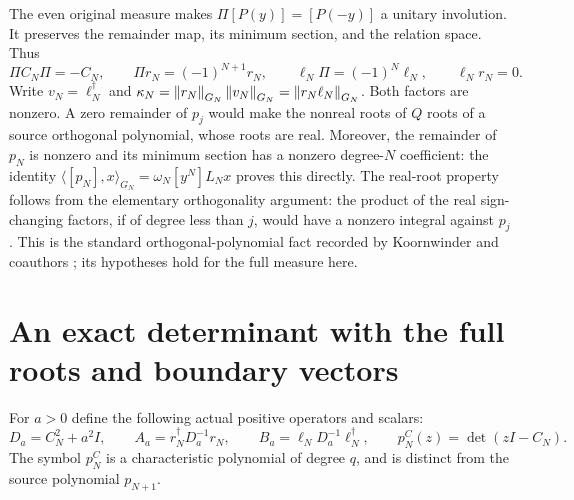 \documentclass[11pt]{article}
\begin{document}
The even original measure makes $\Pi[P(y)]=[P(-y)]$ a unitary involution.
It preserves the remainder map, its minimum section, and the relation
space. Thus
\begin{equation}\tag{SD3}
\Pi C_N\Pi=-C_N,\qquad
\Pi r_N=(-1)^{N+1}r_N,\qquad
\ell_N\Pi=(-1)^N\ell_N,\qquad \ell_Nr_N=0.
\end{equation}
Write $v_N=\ell_N^\dagger$ and
$\kappa_N=\left\lVert r_N\right\rVert_{G_N}\left\lVert v_N\right\rVert_{G_N}=\left\lVert r_N\ell_N\right\rVert_{G_N}$.
Both factors are nonzero. A zero remainder of $p_j$ would make the
nonreal roots of $Q$ roots of a source orthogonal polynomial, whose
roots are real. Moreover, the remainder of $p_N$ is nonzero and its
minimum section has a nonzero degree-$N$ coefficient: the identity
$\langle[p_N],x\rangle_{G_N}=\omega_N[y^N]L_Nx$ proves this directly.
The real-root property follows from the elementary orthogonality
argument: the product of the real sign-changing factors, if of degree
less than $j$, would have a nonzero integral against $p_j$. This is the
standard orthogonal-polynomial fact recorded by Koornwinder and
coauthors \cite{osd:DLMF}; its hypotheses hold for the full measure here.

\section{An exact determinant with the full roots and boundary vectors}
For $a>0$ define the following actual positive operators and scalars:
\begin{equation}\tag{SD4}
D_a=C_N^2+a^2I,\qquad
A_a=r_N^\dagger D_a^{-1}r_N,\qquad
B_a=\ell_ND_a^{-1}\ell_N^\dagger,\qquad
p_N^C(z)=\det(zI-C_N).
\end{equation}
The symbol $p_N^C$ is a characteristic polynomial of degree $q$, and
is distinct from the source polynomial $p_{N+1}$.
\end{document}

